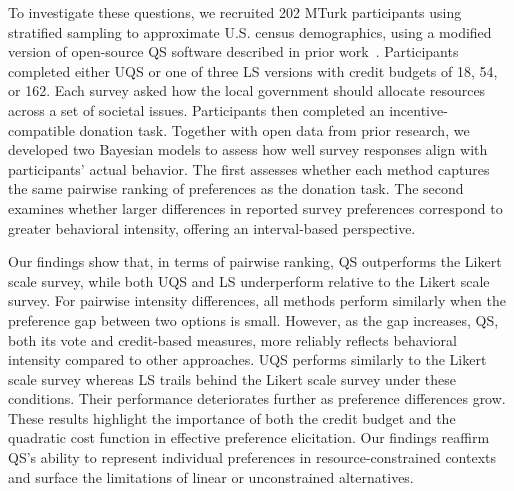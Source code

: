 
To investigate these questions, we recruited 202 MTurk participants using stratified sampling to approximate U.S. census demographics, using a modified version of open-source QS software described in prior work~\cite{chengCanShowWhat2021}. Participants completed either UQS or one of three LS versions with credit budgets of 18, 54, or 162. Each survey asked how the local government should allocate resources across a set of societal issues. Participants then completed an incentive-compatible donation task. Together with open data from prior research, we developed two Bayesian models to assess how well survey responses align with participants' actual behavior. The first assesses whether each method captures the same pairwise ranking of preferences as the donation task. The second examines whether larger differences in reported survey preferences correspond to greater behavioral intensity, offering an interval-based perspective.

Our findings show that, in terms of pairwise ranking, QS outperforms the Likert scale survey, while both UQS and LS underperform relative to the Likert scale survey. For pairwise intensity differences, all methods perform similarly when the preference gap between two options is small. However, as the gap increases, QS, both its vote and credit-based measures, more reliably reflects behavioral intensity compared to other approaches. UQS performs similarly to the Likert scale survey whereas LS trails behind the Likert scale survey under these conditions. Their performance deteriorates further as preference differences grow. These results highlight the importance of both the credit budget and the quadratic cost function in effective preference elicitation. Our findings reaffirm QS's ability to represent individual preferences in resource-constrained contexts and surface the limitations of linear or unconstrained alternatives.


